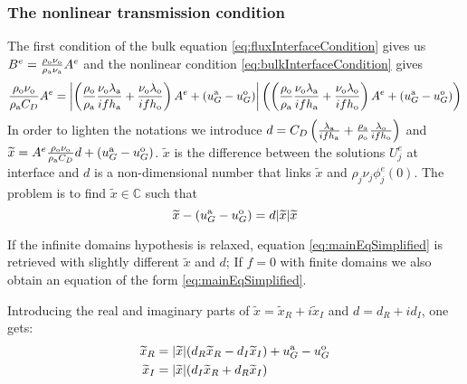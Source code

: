 \subsubsection{The nonlinear transmission condition}
\label{sec:OASchwarz_SteadyStateNonlinear}
The first condition of the bulk equation \eqref{eq:fluxInterfaceCondition} gives us $B^e = \frac{\rho_{\rm o} \nu_{\rm o}}{\rho_{\rm a} \nu_{\rm a} } A^e$
and the nonlinear condition \eqref{eq:bulkInterfaceCondition} gives
\begin{equation} \label{eq:stationaryBulkFirstEq}
    \frac{\rho_{\rm o} \nu_{\rm o}}{\rho_{\rm a} C_D} A^e
    =
    \left|
    \left(
    \frac{\rho_{\rm o}}{\rho_{\rm a}}\frac{\nu_{\rm o}\lambda_{\rm a}}{if h_{\rm a}} 
    +\frac{\nu_{\rm o}\lambda_{\rm o}}{if h_{\rm o}} \right) A^e
    + (u_G^{\rm a} - u_G^{\rm o})
    \right|
    \left(
    \left(
    \frac{\rho_{\rm o}}{\rho_{\rm a}}\frac{\nu_{\rm o}\lambda_{\rm a}}{if h_{\rm a}} 
    +\frac{\nu_{\rm o}\lambda_{\rm o}}{if h_{\rm o}} \right) A^e
    + (u_G^{\rm a} - u_G^{\rm o})
    \right)
\end{equation}
In order to lighten the notations we introduce $d = C_D \left(
    \frac{\lambda_{\rm a}}{if h_{\rm a}} 
    +\frac{\rho_{\rm a}}{\rho_{\rm o}}\frac{\lambda_{\rm o}}{if h_{\rm o}} \right)$ and
$\widetilde{x} = A^e \frac{\rho_{\rm o} \nu_{\rm o}}{\rho_{\rm a} C_D}d+\left(u_G^{\rm a} - u_G^{\rm o}\right)$.
$\widetilde{x}$ is the difference between the
solutions ${U}^e_j$ at interface
and $d$ is a non-dimensional number that links
$\widetilde{x}$ and $\rho_j \nu_j {\phi}^e_j(0)$.
The problem is to find $\widetilde{x}\in \mathbb{C}$ such that
\begin{equation} \label{eq:mainEqSimplified}
    \widetilde{x} - \left(u_G^{\rm a} - u_G^{\rm o}\right) = d|\widetilde{x}|\widetilde{x}
\end{equation}
\begin{remark}
If the infinite domains hypothesis is relaxed, equation \eqref{eq:mainEqSimplified} is retrieved with slightly different $\widetilde{x}$ and $d$;
If $f=0$ with finite domains we also obtain an equation of
the form \eqref{eq:mainEqSimplified}.
\end{remark}
Introducing the real and imaginary parts of
$\widetilde{x}=\widetilde{x}_R+i{\widetilde{x}_I}$ and
$d={d_R}+i{d_I}$, one gets:
\begin{equation}
    \begin{aligned}
    \widetilde{x}_R &= |\widetilde{x}|({d_R} \widetilde{x}_R - {d_I}{\widetilde{x}_I}) +u_G^{\rm a} - u_G^{\rm o} \\
    {\widetilde{x}_I} &= |\widetilde{x}|({d_I}\widetilde{x}_R + {d_R}{\widetilde{x}_I})
    \end{aligned}
\end{equation}
